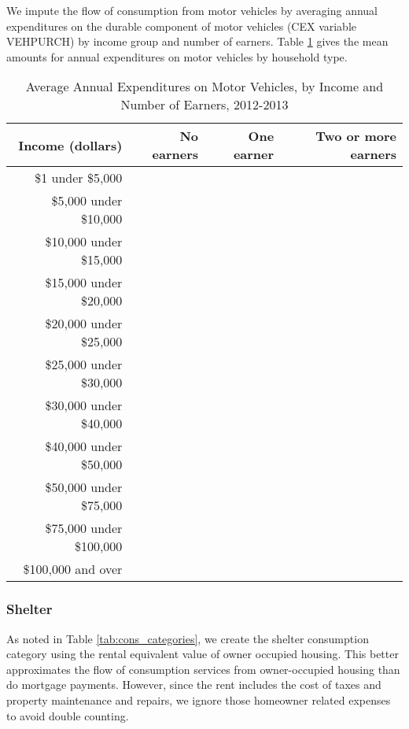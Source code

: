 \documentclass[article,11pt,letterpaper,fleqn]{article}
\theoremstyle{definition}
\numberwithin{equation}{section}
\begin{document}
We impute the flow of consumption from motor vehicles by averaging annual expenditures on the durable component of motor vehicles (CEX variable VEHPURCH) by income group and number of earners.  Table \ref{tab:impute_motor} gives the mean amounts for annual expenditures on motor vehicles by household type.

\begin{table}[h!]
  \centering
  \caption{Average Annual Expenditures on Motor Vehicles, by Income and Number of Earners, 2012-2013}
    \begin{tabular}{rrrr}
    \hline
    \hline
    Income (dollars) & No earners & One earner & Two or more earners \\
    \hline
    \$1 under \$5,000 &       &       &  \\
    \$5,000 under \$10,000 &       &       &  \\
    \$10,000 under \$15,000 &       &       &  \\
    \$15,000 under \$20,000 &       &       &  \\
    \$20,000 under \$25,000 &       &       &  \\
    \$25,000 under \$30,000 &       &       &  \\
    \$30,000 under \$40,000 &       &       &  \\
    \$40,000 under \$50,000 &       &       &  \\
    \$50,000 under \$75,000 &       &       &  \\
    \$75,000 under \$100,000 &       &       &  \\
    \$100,000 and over &       &       &  \\
    \hline
    \hline
    \end{tabular}%
  \label{tab:impute_motor}%
\end{table}%



\subsubsection{Shelter}

As noted in Table \ref{tab:cons_categories}, we create the shelter consumption category using the rental equivalent value of owner occupied housing.  This better approximates the flow of consumption services from owner-occupied housing than do mortgage payments.  However, since the rent includes the cost of taxes and property maintenance and repairs, we ignore those homeowner related expenses to avoid double counting.
\end{document}
